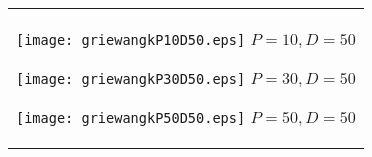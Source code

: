 \documentclass[a4paper,11pt,oneside,openany]{jsbook}
\begin{document}
\begin{figure}[htbp]
  \begin{center}
    \begin{tabular}{c}


      \begin{minipage}{0.33\hsize}
        \begin{center}
          \texttt{[image: griewangkP10D50.eps]}
          \hspace{1.2cm} $P=10, D=50
$        \end{center}
      \end{minipage}

      \begin{minipage}{0.33\hsize}
        \begin{center}
          \texttt{[image: griewangkP30D50.eps]}
          \hspace{1.2cm} $P=30, D=50
$        \end{center}
      \end{minipage}

      \begin{minipage}{0.33\hsize}
        \begin{center}
          \texttt{[image: griewangkP50D50.eps]}
          \hspace{1.2cm} $P=50, D=50
$        \end{center}
      \end{minipage}
    \end{tabular}
  \end{center}
\end{figure}
\end{document}
